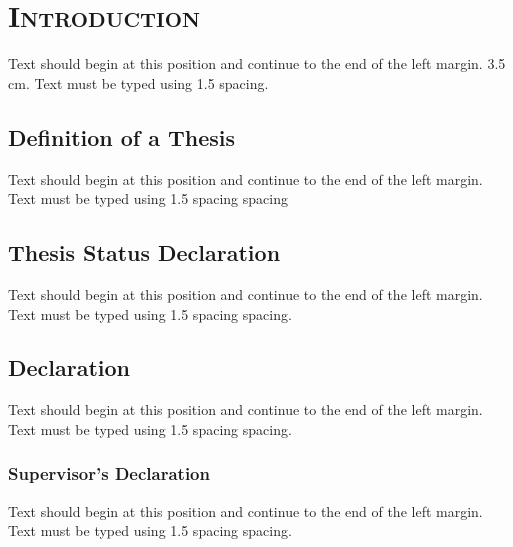 
\chapter{\textsc{Introduction}}
Text should begin at this position and continue to the end of the left margin.
3.5 cm. Text must be typed using 1.5 spacing.
\section{Definition of a Thesis}
Text should begin at this position and continue to the end of the left margin.
Text must be typed using 1.5 spacing spacing
\section{Thesis Status Declaration}
Text should begin at this position and continue to the end of the left margin.
Text must be typed using 1.5 spacing spacing.
\section{Declaration}
Text should begin at this position and continue to the end of the left margin.
Text must be typed using 1.5 spacing spacing.
\subsection{Supervisor’s Declaration }
Text should begin at this position and continue to the end of the left margin.
Text must be typed using 1.5 spacing spacing.
